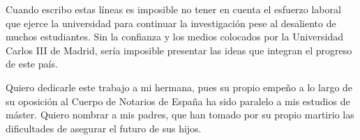 \documentclass[12pt]{report} %
\begin{document}
\setcounter{page}{5}
	
	Cuando escribo estas líneas es imposible no tener en cuenta el esfuerzo laboral que ejerce la universidad para continuar la investigación pese al desaliento de muchos estudiantes.
	Sin la confianza y los medios colocados por la Universidad Carlos III de Madrid, sería imposible presentar las ideas que integran el progreso de este país.
	
	Quiero dedicarle este trabajo a mi hermana, pues su propio empeño a lo largo de su oposición al Cuerpo de Notarios de España ha sido paralelo a mis estudios de máster.
	Quiero nombrar a mis padres, que han tomado por su propio martirio las dificultades de asegurar el futuro de sus hijos.
		
	\vfill
	
	\newpage %
	\thispagestyle{empty}
	\mbox{}
	


\tableofcontents
\thispagestyle{fancy}

\newpage %
\thispagestyle{empty}
\mbox{}

\listoffigures
\thispagestyle{fancy}

\newpage %
\thispagestyle{empty}
\mbox{}

\listoftables
\thispagestyle{fancy}

\newpage %
\thispagestyle{empty}
\mbox{}



\clearpage
{} %

	

    
\end{document}
